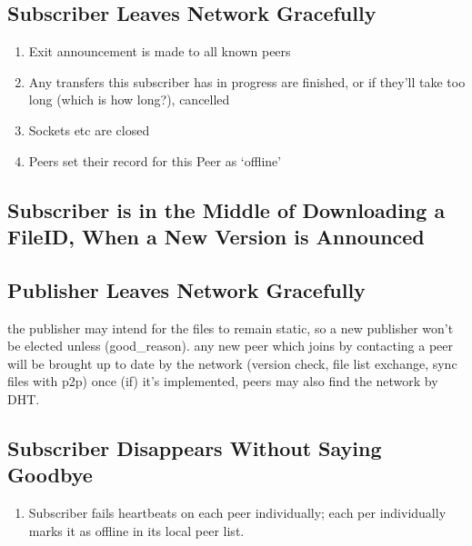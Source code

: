 \documentclass[12pt,a4paper,]{adreport}
\begin{document}
\subsection{Subscriber Leaves Network
Gracefully}\label{subscriber-leaves-network-gracefully}

\begin{enumerate}
\def\labelenumi{\arabic{enumi}.}
\itemsep1pt\parskip0pt
\item
  Exit announcement is made to all known peers
\item
  Any transfers this subscriber has in progress are finished, or if
  they'll take too long (which is how long?), cancelled
\item
  Sockets etc are closed
\item
  Peers set their record for this Peer as `offline'
\end{enumerate}

\subsection{Subscriber is in the Middle of Downloading a FileID, When a
New Version is
Announced}\label{subscriber-is-in-the-middle-of-downloading-a-fileid-when-a-new-version-is-announced}

\subsection{Publisher Leaves Network
Gracefully}\label{publisher-leaves-network-gracefully}

the publisher may intend for the files to remain static, so a new
publisher won't be elected unless (good\_reason). any new peer which
joins by contacting a peer will be brought up to date by the network
(version check, file list exchange, sync files with p2p) once (if) it's
implemented, peers may also find the network by DHT.

\subsection{Subscriber Disappears Without Saying
Goodbye}\label{subscriber-disappears-without-saying-goodbye}

\begin{enumerate}
\def\labelenumi{\arabic{enumi}.}
\itemsep1pt\parskip0pt
\item
  Subscriber fails heartbeats on each peer individually; each per
  individually marks it as offline in its local peer list.
\end{enumerate}
\end{document}
